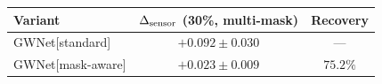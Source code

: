 \begin{tabular}{lcc}
\toprule
\textbf{Variant} & \textbf{$\Delta_{\text{sensor}}$ (30\%, multi-mask)} & \textbf{Recovery} \\
\midrule
GWNet[standard] & $+0.092\pm0.030$ & --- \\
GWNet[mask-aware] & $+0.023\pm0.009$ & $75.2\%$ \\
\bottomrule
\end{tabular}

